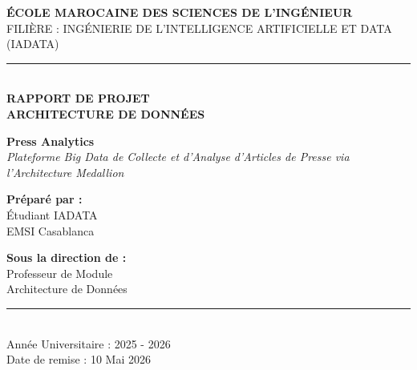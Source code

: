 \documentclass[12pt,a4paper]{article}
\begin{document}
\begin{titlepage}
    \centering
    \vspace*{1cm}
    {\large \textbf{ÉCOLE MAROCAINE DES SCIENCES DE L'INGÉNIEUR}}\\[0.2cm]
    {\large FILIÈRE : INGÉNIERIE DE L'INTELLIGENCE ARTIFICIELLE ET DATA (IADATA)}\\[0.5cm]
    \rule{\linewidth}{0.5mm}\\[1cm]
    
    {\Huge \textbf{\textcolor{primary}{RAPPORT DE PROJET}}}\\[0.4cm]
    {\Large \textbf{ARCHITECTURE DE DONNÉES}}\\[1cm]
    
    \begin{tcolorbox}[colback=white!95!primary,colframe=primary,arc=10pt,boxrule=1pt,width=0.9\textwidth,center]
        \centering
        \vspace{0.5cm}
        {\huge \textbf{Press Analytics}}\\[0.3cm]
        {\large \textit{Plateforme Big Data de Collecte et d'Analyse d'Articles de Presse via l'Architecture Medallion}}
        \vspace{0.5cm}
    \end{tcolorbox}
    
    \vspace{2cm}
    
    \begin{minipage}{0.45\textwidth}
        \begin{flushleft} \large
            \textbf{\textcolor{secondary}{Préparé par :}}\\
            Étudiant IADATA\\
            EMSI Casablanca
        \end{flushleft}
    \end{minipage}
    \begin{minipage}{0.45\textwidth}
        \begin{flushright} \large
            \textbf{\textcolor{secondary}{Sous la direction de :}}\\
            Professeur de Module\\
            Architecture de Données
        \end{flushright}
    \end{minipage}

    \vfill
    
    \rule{\linewidth}{0.5mm}\\[0.4cm]
    {\large Année Universitaire : 2025 - 2026}\\[0.2cm]
    {\large Date de remise : 10 Mai 2026}
\end{titlepage}
\end{document}

